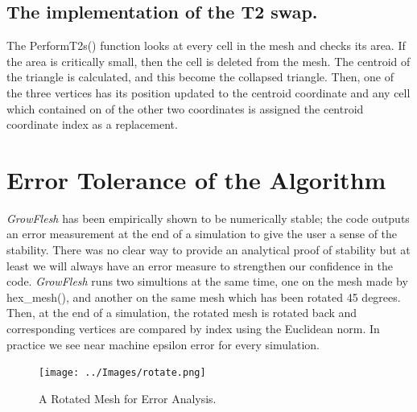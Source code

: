 \subsection{The implementation of the T2 swap.}
The PerformT2s() function looks at every cell in the mesh and checks its area. If the area is critically small, then the cell is deleted from the mesh. The centroid of the triangle is calculated, and this become the collapsed triangle. Then, one of the three vertices has its position updated to the centroid coordinate and any cell which contained on of the other two coordinates is assigned the centroid coordinate index as a replacement.

\section{Error Tolerance of the Algorithm}
\emph{GrowFlesh} has been empirically shown to be numerically stable; the code outputs an error measurement at the end of a simulation to give the user a sense of the stability. There was no clear way to provide an analytical proof of stability but at least we will always have an error measure to strengthen our confidence in the code. \emph{GrowFlesh} runs two simultions at the same time, one on the mesh made by hex\_mesh(), and another on the same mesh which has been rotated 45 degrees. Then, at the end of a simulation, the rotated mesh is rotated back and corresponding vertices are compared by index using the Euclidean norm. In practice we see near machine epsilon error for every simulation.

\begin{figure}[hr]
\centering
\texttt{[image: ../Images/rotate.png]}
\caption{A Rotated Mesh for Error Analysis.}
\end{figure}
